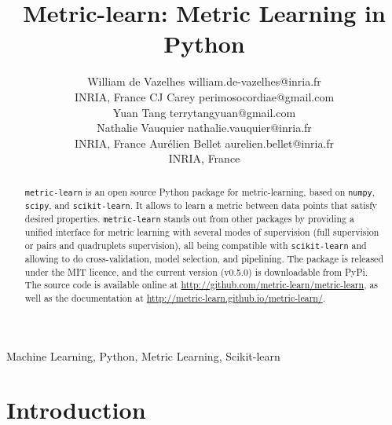 \documentclass[twoside,11pt]{article}
\begin{document}
\title{Metric-learn: Metric Learning in Python}

\author{\name William de Vazelhes \email william.de-vazelhes@inria.fr \\
       \addr INRIA, France
       \AND
       \name CJ Carey \email perimosocordiae@gmail.com \\
       \addr {}
       \AND
       \name Yuan Tang \email terrytangyuan@gmail.com \\
       \addr {}
       \AND
       \name Nathalie Vauquier \email nathalie.vauquier@inria.fr \\
       \addr INRIA, France
       \AND
       \name Aur\'elien Bellet \email aurelien.bellet@inria.fr \\
       \addr INRIA, France
       }

\editor{}

\maketitle

\begin{abstract}%
\texttt{metric-learn} is an open source Python package for metric-learning, based on \texttt{numpy}, \texttt{scipy}, and \texttt{scikit-learn}. It allows to learn a metric between data points that satisfy desired properties. \texttt{metric-learn} stands out from other packages by providing a unified interface for metric learning with several modes of supervision (full supervision or pairs and quadruplets supervision), all being compatible with \texttt{scikit-learn} and allowing to do cross-validation, model selection, and pipelining. The package is released under the MIT licence, and the current version (v0.5.0) is downloadable from PyPi. The source code is available online at \url{http://github.com/metric-learn/metric-learn}, as well as the documentation at \url{http://metric-learn.github.io/metric-learn/}.
\end{abstract}




\begin{keywords}
  Machine Learning, Python, Metric Learning, Scikit-learn
\end{keywords}

\section{Introduction}
\end{document}
